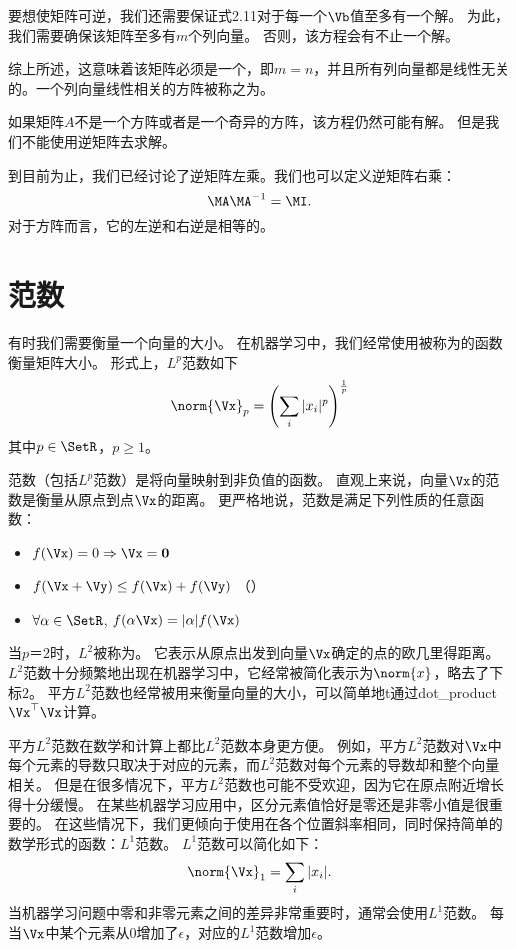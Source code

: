 要想使矩阵可逆，我们还需要保证式2.11对于每一个$\Vb$值至多有一个解。
为此，我们需要确保该矩阵至多有$m$个列向量。
否则，该方程会有不止一个解。


综上所述，这意味着该矩阵必须是一个，即$m=n$，并且所有列向量都是线性无关的。一个列向量线性相关的方阵被称之为。


如果矩阵$A$不是一个方阵或者是一个奇异的方阵，该方程仍然可能有解。
但是我们不能使用逆矩阵去求解。


到目前为止，我们已经讨论了逆矩阵左乘。我们也可以定义逆矩阵右乘：
\begin{equation}
\MA\MA^{-1}=\MI.
\end{equation}
对于方阵而言，它的左逆和右逆是相等的。




\section{范数}
\label{sec:norms}

有时我们需要衡量一个向量的大小。
在机器学习中，我们经常使用被称为的函数衡量矩阵大小。
形式上，$L^p$范数如下
\begin{equation}
    \norm{\Vx}_p = \left( \sum_i |x_i|^p \right)^{\frac{1}{p}}
\end{equation}
其中$p\in \SetR$，$p\geq 1$。





范数（包括$L^p$范数）是将向量映射到非负值的函数。
直观上来说，向量$\Vx$的范数是衡量从原点到点$\Vx$的距离。
更严格地说，范数是满足下列性质的任意函数：
\begin{itemize}
\item $f(\Vx) = 0 \Rightarrow \Vx = \mathbf{0}$ 
\item $f(\Vx + \Vy) \leq f(\Vx) + f(\Vy)$ （）
\item $\forall \alpha \in \SetR$, $f(\alpha \Vx) = |\alpha| f(\Vx)$
\end{itemize}


当$p＝2$时，$L^2$被称为。
它表示从原点出发到向量$\Vx$确定的点的欧几里得距离。
$L^2$范数十分频繁地出现在机器学习中，它经常被简化表示为$\norm{x}$，略去了下标$2$。
平方$L^2$范数也经常被用来衡量向量的大小，可以简单地t通过\gls{dot_product}$\Vx^\top\Vx$计算。


平方$L^2$范数在数学和计算上都比$L^2$范数本身更方便。
例如，平方$L^2$范数对$\Vx$中每个元素的导数只取决于对应的元素，而$L^2$范数对每个元素的导数却和整个向量相关。
但是在很多情况下，平方$L^2$范数也可能不受欢迎，因为它在原点附近增长得十分缓慢。
在某些机器学习应用中，区分元素值恰好是零还是非零小值是很重要的。
在这些情况下，我们更倾向于使用在各个位置斜率相同，同时保持简单的数学形式的函数：$L^1$范数。
$L^1$范数可以简化如下：
\begin{equation}
    \norm{\Vx}_1 = \sum_i  |x_i|.
\end{equation}
当机器学习问题中零和非零元素之间的差异非常重要时，通常会使用$L^1$范数。
每当$\Vx$中某个元素从$0$增加了$\epsilon$，对应的$L^1$范数增加$\epsilon$。


